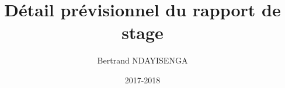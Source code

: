 \documentclass[a4paper,10pt]{report}
\title{Détail prévisionnel du rapport de stage} \let\Title\@title
\author{Bertrand NDAYISENGA} \let\Author\@author
\date{2017-2018} \let\Date\@date
\begin{document}











 \centering 
 
\end{document}
